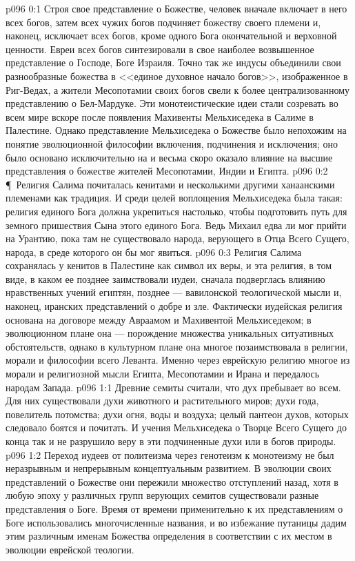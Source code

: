 \vs p096 0:1 Строя свое представление о Божестве, человек вначале включает в него всех богов, затем всех чужих богов подчиняет божеству своего племени и, наконец, исключает всех богов, кроме одного Бога окончательной и верховной ценности. Евреи всех богов синтезировали в свое наиболее возвышенное представление о Господе, Боге Израиля. Точно так же индусы объединили свои разнообразные божества в <<единое духовное начало богов>>, изображенное в Риг\hyp{}Ведах, а жители Месопотамии своих богов свели к более централизованному представлению о Бел\hyp{}Мардуке. Эти монотеистические идеи стали созревать во всем мире вскоре после появления Махивенты Мельхиседека в Салиме в Палестине. Однако представление Мельхиседека о Божестве было непохожим на понятие эволюционной философии включения, подчинения и исключения; оно было основано исключительно на  и весьма скоро оказало влияние на высшие представления о божестве жителей Месопотамии, Индии и Египта.
\vs p096 0:2 \P\ Религия Салима почиталась кенитами и несколькими другими ханаанскими племенами как традиция. И среди целей воплощения Мельхиседека была такая: религия единого Бога должна укрепиться настолько, чтобы подготовить путь для земного пришествия Сына этого единого Бога. Ведь Михаил едва ли мог прийти на Урантию, пока там не существовало народа, верующего в Отца Всего Сущего, народа, в среде которого он бы мог явиться.
\vs p096 0:3 Религия Салима сохранялась у кенитов в Палестине как символ их веры, и эта религия, в том виде, в каком ее позднее заимствовали иудеи, сначала подверглась влиянию нравственных учений египтян, позднее --- вавилонской теологической мысли и, наконец, иранских представлений о добре и зле. Фактически иудейская религия основана на договоре между Авраамом и Махивентой Мельхиседеком; в эволюционном плане она --- порождение множества уникальных ситуативных обстоятельств, однако в культурном плане она многое позаимствовала в религии, морали и философии всего Леванта. Именно через еврейскую религию многое из морали и религиозной мысли Египта, Месопотамии и Ирана и передалось народам Запада.
\vs p096 1:1 Древние семиты считали, что дух пребывает во всем. Для них существовали духи животного и растительного миров; духи года, повелитель потомства; духи огня, воды и воздуха; целый пантеон духов, которых следовало боятся и почитать. И учения Мельхиседека о Творце Всего Сущего до конца так и не разрушило веру в эти подчиненные духи или в богов природы.
\vs p096 1:2 Переход иудеев от политеизма через генотеизм к монотеизму не был неразрывным и непрерывным концептуальным развитием. В эволюции своих представлений о Божестве они пережили множество отступлений назад, хотя в любую эпоху у различных групп верующих семитов существовали разные представления о Боге. Время от времени применительно к их представлениям о Боге использовались многочисленные названия, и во избежание путаницы дадим этим различным именам Божества определения в соответствии с их местом в эволюции еврейской теологии.

